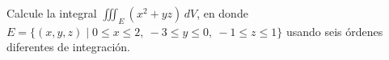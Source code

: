 \item Calcule la integral $\iiint_E (x^2 + yz) \, dV$, en donde $E = \{(x, y, z) \mid 0 \le x \le 2, \ -3 \le y \le 0, \ -1 \le z \le 1\}$ usando seis órdenes diferentes de integración.
